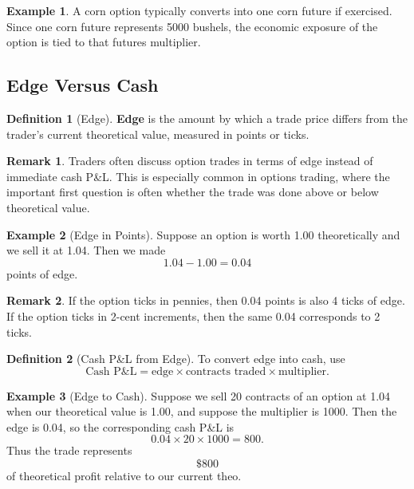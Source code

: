 \documentclass[11pt]{article}
\theoremstyle{definition}
\newtheorem{definition}{Definition}[section]
\newtheorem{example}{Example}[section]
\newtheorem{remark}{Remark}[section]
\begin{document}
\begin{example}
A corn option typically converts into one corn future if exercised. Since one corn future represents 5000 bushels, the economic exposure of the option is tied to that futures multiplier.
\end{example}

\subsection{Edge Versus Cash}

\begin{definition}[Edge]
\textbf{Edge} is the amount by which a trade price differs from the trader's current theoretical value, measured in points or ticks.
\end{definition}

\begin{remark}
Traders often discuss option trades in terms of edge instead of immediate cash P\&L. This is especially common in options trading, where the important first question is often whether the trade was done above or below theoretical value.
\end{remark}

\begin{example}[Edge in Points]
Suppose an option is worth 1.00 theoretically and we sell it at 1.04. Then we made
\[
1.04 - 1.00 = 0.04
\]
points of edge.
\end{example}

\begin{remark}
If the option ticks in pennies, then 0.04 points is also 4 ticks of edge. If the option ticks in 2-cent increments, then the same 0.04 corresponds to 2 ticks.
\end{remark}

\begin{definition}[Cash P\&L from Edge]
To convert edge into cash, use
\[
\text{Cash P\&L} = \text{edge} \times \text{contracts traded} \times \text{multiplier}.
\]
\end{definition}

\begin{example}[Edge to Cash]
Suppose we sell 20 contracts of an option at 1.04 when our theoretical value is 1.00, and suppose the multiplier is 1000. Then the edge is 0.04, so the corresponding cash P\&L is
\[
0.04 \times 20 \times 1000 = 800.
\]
Thus the trade represents
\[
\boxed{\$800}
\]
of theoretical profit relative to our current theo.
\end{example}
\end{document}

